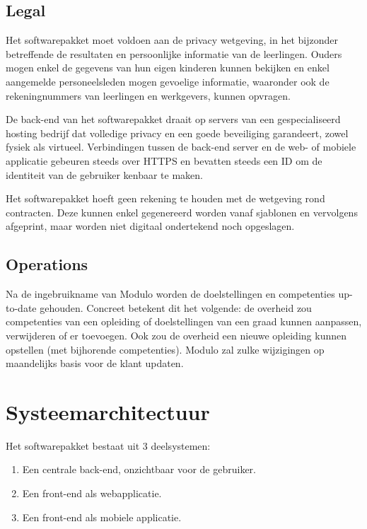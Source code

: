 \documentclass[a4paper]{article}
\begin{document}
\subsection{Legal}
Het softwarepakket moet voldoen aan de privacy wetgeving, in het bijzonder betreffende de resultaten en persoonlijke informatie van de leerlingen. Ouders mogen enkel de gegevens van hun eigen kinderen kunnen bekijken en enkel aangemelde personeelsleden mogen gevoelige informatie, waaronder ook de rekeningnummers van leerlingen en werkgevers, kunnen opvragen.

De back-end van het softwarepakket draait op servers van een gespecialiseerd hosting bedrijf dat volledige privacy en een goede beveiliging garandeert, zowel fysiek als virtueel. Verbindingen tussen de back-end server en de web- of mobiele applicatie gebeuren steeds over HTTPS en bevatten steeds een ID om de identiteit van de gebruiker kenbaar te maken.

Het softwarepakket hoeft geen rekening te houden met de wetgeving rond contracten. Deze kunnen enkel gegenereerd worden vanaf sjablonen en vervolgens afgeprint, maar worden niet digitaal ondertekend noch opgeslagen.


\subsection{Operations}
Na de ingebruikname van Modulo worden de doelstellingen en competenties up-to-date gehouden. Concreet betekent dit het volgende: de overheid zou competenties van een opleiding of doelstellingen van een graad kunnen aanpassen, verwijderen of er toevoegen. Ook zou de overheid een nieuwe opleiding kunnen opstellen (met bijhorende competenties). Modulo zal zulke wijzigingen op maandelijks basis voor de klant updaten.




\newpage
\section{Systeemarchitectuur}  \label{sec:systeemarchitectuur} %
Het softwarepakket bestaat uit 3 deelsystemen:

\begin{enumerate}
    \item Een centrale back-end, onzichtbaar voor de gebruiker.
    \item Een front-end als webapplicatie.
    \item Een front-end als mobiele applicatie.
\end{enumerate}
\end{document}
